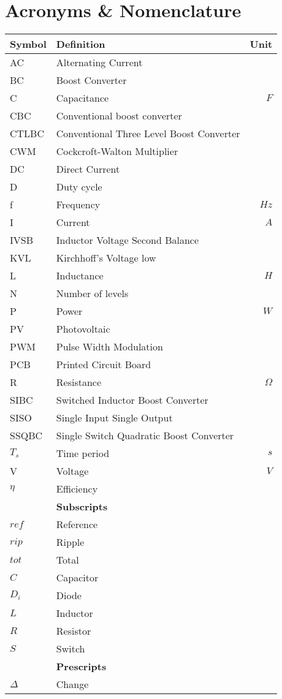 \vspace{-24mm}
\section*{Acronyms \& Nomenclature}

\begin{tabular*}{\textwidth}{@{\extracolsep{\fill}} l l r}
	\textbf{Symbol}	& \textbf{Definition}			& \textbf{Unit}\\
	\hline
	AC			& Alternating Current				& \\
	BC			& Boost Converter					& \\
	C			& Capacitance						& $F$\\
	CBC			& Conventional boost converter					& \\
	CTLBC		&Conventional Three Level Boost Converter		& \\
	CWM		    & Cockcroft-Walton Multiplier 		& \\
	DC			& Direct Current					& \\
	D			& Duty cycle					& \\
	f			& Frequency					& $Hz$\\
	I			& Current							& $A$\\
	IVSB		& Inductor Voltage Second Balance				& \\
	KVL			& Kirchhoff's Voltage low				& \\
	L			& Inductance					& $H$\\
	N			& Number of levels						& \\
	P			& Power								& $W$\\
	PV			& Photovoltaic						& \\
	PWM			& Pulse Width Modulation						& \\
	PCB			& Printed Circuit Board					& \\
	R			& Resistance						& $\Omega$\\
	SIBC			&Switched Inductor Boost Converter			& \\
	SISO		& Single Input Single Output		& \\
	SSQBC			&Single Switch Quadratic Boost Converter	& \\
	$T_s$		& Time period					&$s$ \\
	V			& Voltage							& $V$\\
	$\eta$		& Efficiency							&	\\
	\hline \hline
				& \textbf{Subscripts}				&	\\
	\hline
	$ref$		& Reference							&	\\
	$rip$		& Ripple							&	\\
	$tot$		& Total								&	\\
	
	$C$			& Capacitor							&	\\
	$D_i$		& Diode							&	\\
	$L$			& Inductor							&	\\
	$R$			& Resistor							&	\\
	$S$			& Switch							&	\\
	\hline \hline

				& \textbf{Prescripts}				&	\\
	\hline
	$\Delta$	& Change							&	\\
	\hline \hline
\end{tabular*}